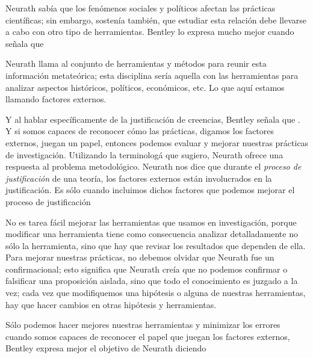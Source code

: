 Neurath sabía que los fenómenos sociales y políticos afectan las prácticas científicas; sin embargo, sostenía también, que estudiar esta relación debe llevarse a cabo con otro tipo de herramientas.
Bentley lo expresa mucho mejor cuando señala que  
\parencite[p.~62]{Bentley2023}

Neurath llama  al conjunto de herramientas y métodos para reunir esta información metateórica; 
esta disciplina sería aquella con las herramientas para analizar aspectos históricos, políticos, económicos, etc.
Lo que aquí estamos llamando factores externos.

Y al hablar específicamente de la justificación de creencias, Bentley señala que  \parencite[p.~41]{Bentley2023}.
Y si somos capaces de reconocer cómo las prácticas, digamos los factores externos,  juegan un papel, entonces podemos evaluar y mejorar nuestras prácticas de investigación.
Utilizando la terminologá que sugiero, Neurath ofrece una respuesta al
problema metodológico. Neurath nos dice que durante el \emph{proceso de
justificación} de una teoría, los factores externos están involucrados en
la justificación. Es sólo cuando incluimos dichos factores que podemos
mejorar el proceso de justificación

No es tarea fácil mejorar las herramientas que usamos en investigación, porque modificar una herramienta tiene como consecuencia analizar detalladamente no sólo la herramienta, sino que hay que revisar los resultados que dependen de ella.
Para mejorar nuestras prácticas, no debemos olvidar que Neurath fue un  confirmacional; esto significa que Neurath creía que no podemos confirmar o falsificar una proposición aislada, sino que todo el conocimiento es juzgado a la vez; 
cada vez que modifiquemos una hipótesis o alguna de nuestras herramientas, hay que hacer cambios en otras hipótesis y herramientas.

Sólo podemos hacer mejores nuestras herramientas y minimizar los errores cuando somos capaces de reconocer el papel que juegan los factores externos, Bentley expresa mejor el objetivo de Neurath diciendo  \parencite[p.~41]{Bentley2023}

